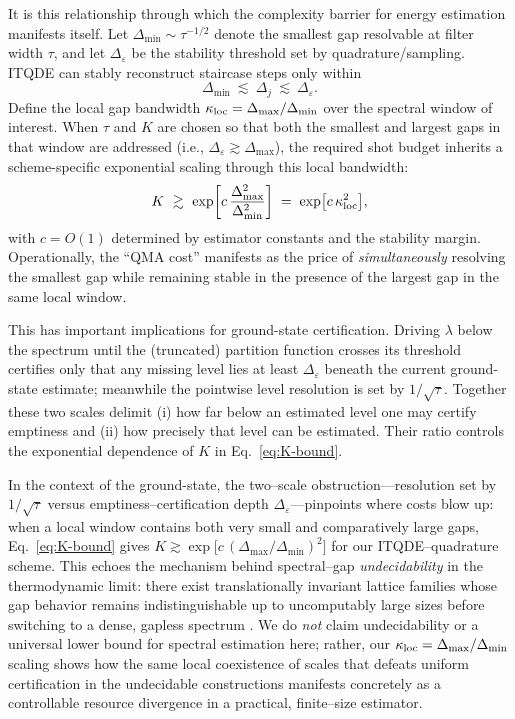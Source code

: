 \documentclass[reprint, aps,prx,showpacs,bibfootnote,preprintnumbers, mathtools, superscriptaddress, amsmath,amssymb]{revtex4-2}
\begin{document}
It is this relationship through which the complexity barrier for energy estimation manifests itself. Let $\Delta_{\min}\!\sim\!\tau^{-1/2}$ denote the smallest gap resolvable at filter width $\tau$, and let $\Delta_\varepsilon$ be the stability threshold set by quadrature/sampling. ITQDE can stably reconstruct staircase steps only within
\begin{equation}
\Delta_{\min}\ \lesssim\ \Delta_j\ \lesssim\ \Delta_\varepsilon.
\end{equation}
Define the local gap bandwidth $\kappa_{\rm loc}=\Delta_{\max}/\Delta_{\min}$ over the spectral window of interest. When $\tau$ and $K$ are chosen so that both the smallest and largest gaps in that window are addressed (i.e., $\Delta_\varepsilon \gtrsim \Delta_{\max}$), the required shot budget inherits a scheme-specific exponential scaling through this local bandwidth:
\begin{equation}
\label{eq:K-bound}
K\ \gtrsim\ \exp\!\left[c\,\frac{\Delta_{\max}^{2}}{\Delta_{\min}^{2}}\right]
\;=\; \exp\!\big[c\,\kappa_{\rm loc}^{2}\big],
\end{equation}
with $c=O(1)$ determined by estimator constants and the stability margin. Operationally, the “QMA cost” manifests as the price of \emph{simultaneously} resolving the smallest gap while remaining stable in the presence of the largest gap in the same local window.

This has important implications for ground-state certification. Driving $\lambda$ below the spectrum until the (truncated) partition function crosses its threshold certifies only that any missing level lies at least $\Delta_\varepsilon$ beneath the current ground-state estimate; meanwhile the pointwise level resolution is set by $1/\sqrt{\tau}$. Together these two scales delimit (i) how far below an estimated level one may certify emptiness and (ii) how precisely that level can be estimated. Their ratio controls the exponential dependence of $K$ in Eq.~\eqref{eq:K-bound}.

In the context of the ground-state, the two–scale obstruction—resolution set by $1/\sqrt{\tau}$ versus emptiness–certification depth $\Delta_\varepsilon$—pinpoints where costs blow up: when a local window contains both very small and comparatively large gaps, Eq.~\eqref{eq:K-bound} gives
$K \gtrsim \exp\!\big[c\,(\Delta_{\max}/\Delta_{\min})^{2}\big]$ for our ITQDE–quadrature scheme. This echoes the mechanism behind spectral–gap \emph{undecidability} in the thermodynamic limit: there exist translationally invariant lattice families whose gap behavior remains indistinguishable up to uncomputably large sizes before switching to a dense, gapless spectrum \cite{cubitt2015undecidability,bausch_undecidability_2020}.
We do \emph{not} claim undecidability or a universal lower bound for spectral estimation here; rather, our $\kappa_{\rm loc}=\Delta_{\max}/\Delta_{\min}$ scaling shows how the same local coexistence of scales that defeats uniform certification in the undecidable constructions manifests concretely as a controllable resource divergence in a practical, finite–size estimator.
\end{document}
